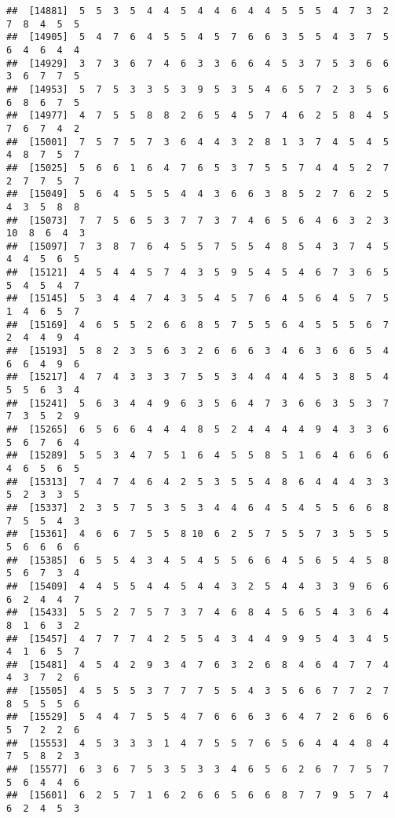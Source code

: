 \documentclass[
]{book}
\begin{document}
\begin{verbatim}
##  [14881]  5  5  3  5  4  4  5  4  4  6  4  4  5  5  5  4  7  3  2  7  8  4  5  5
##  [14905]  5  4  7  6  4  5  5  4  5  7  6  6  3  5  5  4  3  7  5  6  4  6  4  4
##  [14929]  3  7  3  6  7  4  6  3  3  6  6  4  5  3  7  5  3  6  6  3  6  7  7  5
##  [14953]  5  7  5  3  3  5  3  9  5  3  5  4  6  5  7  2  3  5  6  6  8  6  7  5
##  [14977]  4  7  5  5  8  8  2  6  5  4  5  7  4  6  2  5  8  4  5  7  6  7  4  2
##  [15001]  7  5  7  5  7  3  6  4  4  3  2  8  1  3  7  4  5  4  5  4  8  7  5  7
##  [15025]  5  6  6  1  6  4  7  6  5  3  7  5  5  7  4  4  5  2  7  2  7  7  5  7
##  [15049]  5  6  4  5  5  5  4  4  3  6  6  3  8  5  2  7  6  2  5  4  3  5  8  8
##  [15073]  7  7  5  6  5  3  7  7  3  7  4  6  5  6  4  6  3  2  3 10  8  6  4  3
##  [15097]  7  3  8  7  6  4  5  5  7  5  5  4  8  5  4  3  7  4  5  4  4  5  6  5
##  [15121]  4  5  4  4  5  7  4  3  5  9  5  4  5  4  6  7  3  6  5  5  4  5  4  7
##  [15145]  5  3  4  4  7  4  3  5  4  5  7  6  4  5  6  4  5  7  5  1  4  6  5  7
##  [15169]  4  6  5  5  2  6  6  8  5  7  5  5  6  4  5  5  5  6  7  2  4  4  9  4
##  [15193]  5  8  2  3  5  6  3  2  6  6  6  3  4  6  3  6  6  5  4  6  6  4  9  6
##  [15217]  4  7  4  3  3  3  7  5  5  3  4  4  4  4  5  3  8  5  4  5  5  6  3  4
##  [15241]  5  6  3  4  4  9  6  3  5  6  4  7  3  6  6  3  5  3  7  7  3  5  2  9
##  [15265]  6  5  6  6  4  4  4  8  5  2  4  4  4  4  9  4  3  3  6  5  6  7  6  4
##  [15289]  5  5  3  4  7  5  1  6  4  5  5  8  5  1  6  4  6  6  6  4  6  5  6  5
##  [15313]  7  4  7  4  6  4  2  5  3  5  5  4  8  6  4  4  4  3  3  5  2  3  3  5
##  [15337]  2  3  5  7  5  3  5  3  4  4  6  4  5  4  5  5  6  6  8  7  5  5  4  3
##  [15361]  4  6  6  7  5  5  8 10  6  2  5  7  5  5  7  3  5  5  5  5  6  6  6  6
##  [15385]  6  5  5  4  3  4  5  4  5  5  6  6  4  5  6  5  4  5  8  5  6  7  3  4
##  [15409]  4  4  5  5  4  4  5  4  4  3  2  5  4  4  3  3  9  6  6  6  2  4  4  7
##  [15433]  5  5  2  7  5  7  3  7  4  6  8  4  5  6  5  4  3  6  4  8  1  6  3  2
##  [15457]  4  7  7  7  4  2  5  5  4  3  4  4  9  9  5  4  3  4  5  4  1  6  5  7
##  [15481]  4  5  4  2  9  3  4  7  6  3  2  6  8  4  6  4  7  7  4  4  3  7  2  6
##  [15505]  4  5  5  5  3  7  7  7  5  5  4  3  5  6  6  7  7  2  7  8  5  5  5  6
##  [15529]  5  4  4  7  5  5  4  7  6  6  6  3  6  4  7  2  6  6  6  5  7  2  2  6
##  [15553]  4  5  3  3  3  1  4  7  5  5  7  6  5  6  4  4  4  8  4  7  5  8  2  3
##  [15577]  6  3  6  7  5  3  5  3  3  4  6  5  6  2  6  7  7  5  7  5  6  4  4  6
##  [15601]  6  2  5  7  1  6  2  6  6  5  6  6  8  7  7  9  5  7  4  6  2  4  5  3

\end{verbatim}
\end{document}
